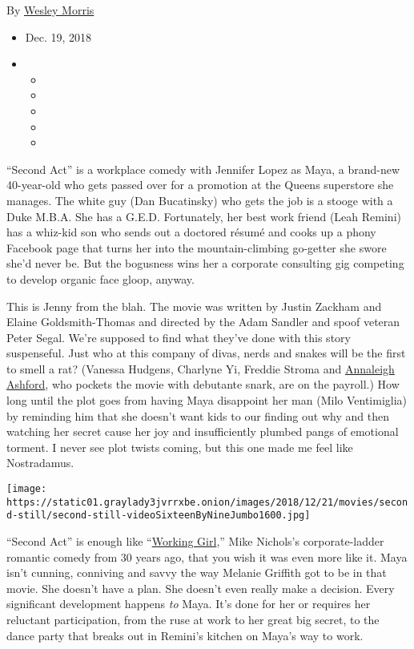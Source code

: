 By \href{https://www.nytimes3xbfgragh.onion/by/wesley-morris}{Wesley
Morris}

\begin{itemize}
\item
  Dec. 19, 2018
\item
  \begin{itemize}
  \item
  \item
  \item
  \item
  \item
  \end{itemize}
\end{itemize}

``Second Act'' is a workplace comedy with Jennifer Lopez as Maya, a
brand-new 40-year-old who gets passed over for a promotion at the Queens
superstore she manages. The white guy (Dan Bucatinsky) who gets the job
is a stooge with a Duke M.B.A. She has a G.E.D. Fortunately, her best
work friend (Leah Remini) has a whiz-kid son who sends out a doctored
résumé and cooks up a phony Facebook page that turns her into the
mountain-climbing go-getter she swore she'd never be. But the bogusness
wins her a corporate consulting gig competing to develop organic face
gloop, anyway.

This is Jenny from the blah. The movie was written by Justin Zackham and
Elaine Goldsmith-Thomas and directed by the Adam Sandler and spoof
veteran Peter Segal. We're supposed to find what they've done with this
story suspenseful. Just who at this company of divas, nerds and snakes
will be the first to smell a rat? (Vanessa Hudgens, Charlyne Yi, Freddie
Stroma and \href{https://www.youtube.com/watch?v=T6AuKn9PCV8}{Annaleigh
Ashford}, who pockets the movie with debutante snark, are on the
payroll.) How long until the plot goes from having Maya disappoint her
man (Milo Ventimiglia) by reminding him that she doesn't want kids to
our finding out why and then watching her secret cause her joy and
insufficiently plumbed pangs of emotional torment. I never see plot
twists coming, but this one made me feel like Nostradamus.

\texttt{[image: https://static01.graylady3jvrrxbe.onion/images/2018/12/21/movies/second-still/second-still-videoSixteenByNineJumbo1600.jpg]}

``Second Act'' is enough like
``\href{https://www.youtube.com/watch?v=odR6tGpZTis}{Working Girl},''
Mike Nichols's corporate-ladder romantic comedy from 30 years ago, that
you wish it was even more like it. Maya isn't cunning, conniving and
savvy the way Melanie Griffith got to be in that movie. She doesn't have
a plan. She doesn't even really make a decision. Every significant
development happens \emph{to} Maya. It's done for her or requires her
reluctant participation, from the ruse at work to her great big secret,
to the dance party that breaks out in Remini's kitchen on Maya's way to
work.

